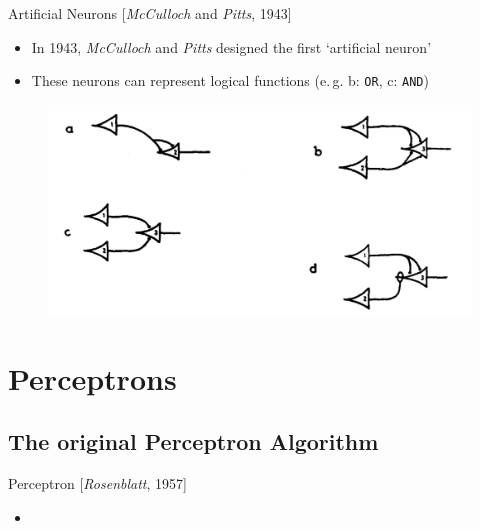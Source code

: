 \begin{frame}{Artificial Neurons [\textit{McCulloch} and \textit{Pitts}, 1943]}{}
	\begin{itemize}
		\item In 1943, \textit{McCulloch} and \textit{Pitts} designed the first `artificial neuron'
		\item These neurons can represent logical functions (e.\,g. b: \texttt{OR}, c: \texttt{AND})
	\end{itemize}
	
	\begin{figure}
		\centering
		\includegraphics[scale=0.25]{10_deep_learning/02_img/mcculloch_pitts}
	\end{figure}
\end{frame}


\section{Perceptrons}

\subsection{The original Perceptron Algorithm}

\begin{frame}{Perceptron [\textit{Rosenblatt}, 1957]}{}
	\begin{itemize}
		\item 
	\end{itemize}
\end{frame}


